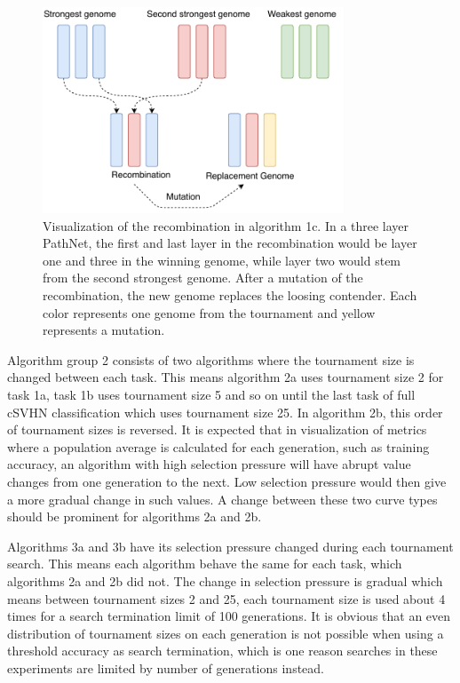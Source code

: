 \begin{figure}[ht]
    \centering
    \includegraphics[width=0.8\textwidth]{Chapters/4.Experiments/exp2/figures/Recombination_algorithm.pdf}
    \caption[Recombination algorithm]{Visualization of the recombination in algorithm 1c. In a three layer PathNet, the first and last layer in the recombination would be layer one and three in the winning genome, while layer two would stem from the second strongest genome. After a mutation of the recombination, the new genome replaces the loosing contender. Each color represents one genome from the tournament and yellow represents a mutation.}
    \label{fig:search.recombination_algorithm}
\end{figure}

Algorithm group 2 consists of two algorithms where the tournament size is changed between each task. This means algorithm 2a uses tournament size 2 for task 1a, task 1b uses tournament size 5 and so on until the last task of full cSVHN classification which uses tournament size 25. In algorithm 2b, this order of tournament sizes is reversed. It is expected that in visualization of metrics where a population average is calculated for each generation, such as training accuracy, an algorithm with high selection pressure will have abrupt value changes from one generation to the next. Low selection pressure would then give a more gradual change in such values. A change between these two curve types should be prominent for algorithms 2a and 2b.

Algorithms 3a and 3b have its selection pressure changed during each tournament search. This means each algorithm behave the same for each task, which algorithms 2a and 2b did not. The change in selection pressure is gradual which means between tournament sizes 2 and 25, each tournament size is used about 4 times for a search termination limit of 100 generations. It is obvious that an even distribution of tournament sizes on each generation is not possible when using a threshold accuracy as search termination, which is one reason searches in these experiments are limited by number of generations instead. 

